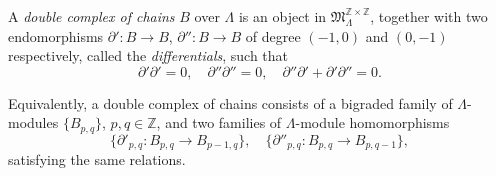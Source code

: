 A \emph{double complex of chains} $B$ over $\Lambda$ is an object in $\mathfrak{M}_{\Lambda}^{\mathbb{Z} \times \mathbb{Z}}$, together with two endomorphisms $\partial' : B \rightarrow B$, $\partial'' : B \rightarrow B$ of degree $(-1, 0)$ and $(0, -1)$ respectively, called the \emph{differentials}, such that
$$\partial' \partial' = 0, \quad \partial'' \partial'' = 0, \quad \partial'' \partial' + \partial' \partial'' = 0.$$

Equivalently, a double complex of chains consists of a bigraded family of $\Lambda$-modules $\{B_{p,q}\}$, $p, q \in \mathbb{Z}$, and two families of $\Lambda$-module homomorphisms
$$\{\partial'_{p,q} : B_{p,q} \rightarrow B_{p-1,q}\}, \quad \{\partial''_{p,q} : B_{p,q} \rightarrow B_{p,q-1}\},$$
satisfying the same relations.
